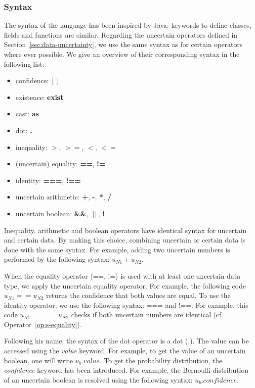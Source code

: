 \subsubsection{Syntax}
The syntax of the language has been inspired by Java: keywords to define classes, fields and functions are similar. 
Regarding the uncertain operators defined in Section~\ref{sec:data-uncertainty}, we use the same syntax as for certain operators where ever possible.
We give an overview of their corresponding syntax in the following list:
\begin{itemize}
    \item confidence: \textbf{[ ]}
    \item existence: \textbf{exist}
    \item cast: \textbf{as}
    \item dot: \textbf{.}
    \item inequality: \textbf{$>$}, \textbf{$>=$}, \textbf{$<$}, \textbf{$<=$}
    \item (uncertain) equality: \textbf{==}, \textbf{!=}
    \item identity: \textbf{===}, \textbf{!==}
    \item uncertain arithmetic: \textbf{+}, \textbf{-}, \textbf{*}, \textbf{/}
    \item uncertain boolean: \textbf{\&\&}, \textbf{$\|$}, \textbf{!} 
\end{itemize}

Inequality, arithmetic and boolean operators have identical syntax for uncertain and certain data.
By making this choice, combining uncertain or certain data is done with the same syntax.
For example, adding two uncertain numbers is performed by the following syntax: $u_{N1} + u_{N2}$.

When the equality operator (==, !=) is used with at least one uncertain data type, we apply the uncertain equality operator.
For example, the following code $u_{N1} == u_{N2}$ returns the confidence that both values are equal.
To use the identity operator, we use the following syntax: === and !==.
For example, this code $u_{N1} === u_{N2}$ checks if both uncertain numbers are identical (cf. Operator~\ref{op:s-equality}).

Following his name, the syntax of the dot operator is a dot (.).
The value can be accessed using the \textit{value} keyword.
For example, to get the value of an uncertain boolean, one will write $u_b.value$.
To get the probability distribution, the \textit{confidence} keyword has been introduced.
For example, the Bernoulli distribution of an uncertain boolean is resolved using the following syntax: $u_b.confidence$.

